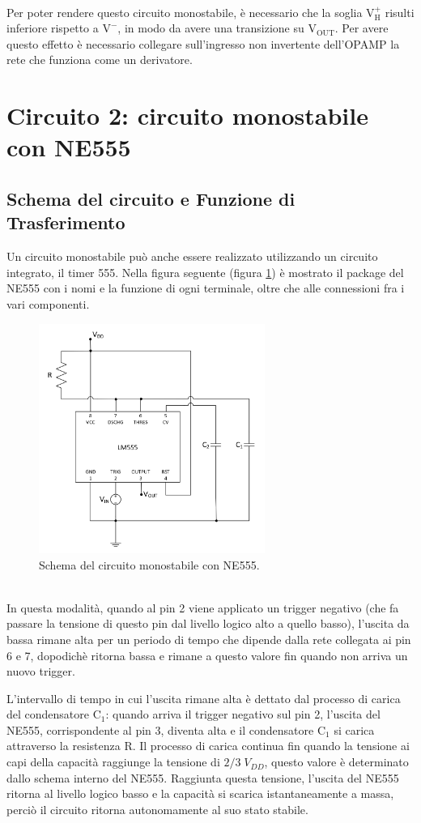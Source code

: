 \documentclass{report}
\begin{document}
\\Per poter rendere questo circuito monostabile, è necessario che la soglia $\mathrm{V_H^+}$ risulti inferiore rispetto a $\mathrm{V^-}$, in modo da avere una transizione su $\mathrm{V_{OUT}}$. Per avere questo effetto è necessario collegare sull'ingresso non invertente dell'OPAMP la rete che funziona come un derivatore.
\newpage
\section{Circuito 2: circuito monostabile con NE555}
\subsection{Schema del circuito e Funzione di Trasferimento}
Un circuito monostabile può anche essere realizzato utilizzando un circuito integrato, il timer 555. Nella figura seguente (figura \ref{figura:schema2}) è mostrato il package del NE555 con i nomi e la funzione di ogni terminale, oltre che alle connessioni fra i vari componenti.
\begin{figure}[h!]
	\centering
	\includegraphics[height=7.5cm]{immagini/schema2}
	\caption{Schema del circuito monostabile con NE555.}
	\label{figura:schema2}
\end{figure}
\\In questa modalità, quando al pin 2 viene applicato un trigger negativo (che fa passare la tensione di questo pin dal livello logico alto a quello basso), l'uscita da bassa rimane alta per un periodo di tempo che dipende dalla rete collegata ai pin 6 e 7, dopodichè ritorna bassa e rimane a questo valore fin quando non arriva un nuovo trigger.\par
L'intervallo di tempo in cui l'uscita rimane alta è dettato dal processo di carica del condensatore $\mathrm{C_1}$: quando arriva il trigger negativo sul pin 2, l'uscita del NE555, corrispondente al pin 3, diventa alta e il condensatore $\mathrm{C_1}$ si carica attraverso la resistenza $\mathrm{R}$. Il processo di carica continua fin quando la tensione ai capi della capacità raggiunge la tensione di $\displaystyle{2/3\;V_{DD}}$, questo valore è determinato dallo schema interno del NE555. Raggiunta questa tensione, l'uscita del NE555 ritorna al livello logico basso e la capacità si scarica istantaneamente a massa, perciò il circuito ritorna autonomamente al suo stato stabile.
\end{document}
